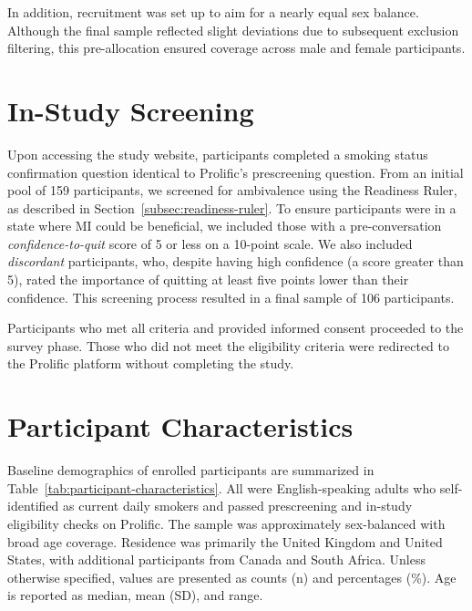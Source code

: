 In addition, recruitment was set up to aim for a nearly equal sex balance. Although the final sample reflected slight deviations due to subsequent exclusion filtering, this pre-allocation ensured coverage across male and female participants.

\section{In-Study Screening}
Upon accessing the study website, participants completed a smoking status confirmation question identical to Prolific's prescreening question. From an initial pool of 159 participants, we screened for ambivalence using the Readiness Ruler, as described in Section~\ref{subsec:readiness-ruler}. To ensure participants were in a state where MI could be beneficial, we included those with a pre-conversation \emph{confidence-to-quit} score of 5 or less on a 10-point scale. We also included \emph{discordant}
participants, who, despite having high confidence (a score greater than 5), rated the importance of quitting at least five points lower than their confidence. This screening process resulted in a final sample of 106 participants.

Participants who met all criteria and provided informed consent proceeded to the survey phase. Those who did not meet the eligibility criteria were redirected to the Prolific platform without completing the study.

\section{Participant Characteristics}
\label{subsec:participant-characteristics}
\noindent Baseline demographics of enrolled participants are summarized in Table~\ref{tab:participant-characteristics}. All were English-speaking adults who self-identified as current daily smokers and passed prescreening and in-study eligibility checks on Prolific. The sample was approximately sex-balanced with broad age coverage. Residence was primarily the United Kingdom and United States, with additional participants from Canada and South Africa. Unless otherwise specified, values are presented as counts (n) and percentages (\%). Age is reported as median, mean (SD), and range.

